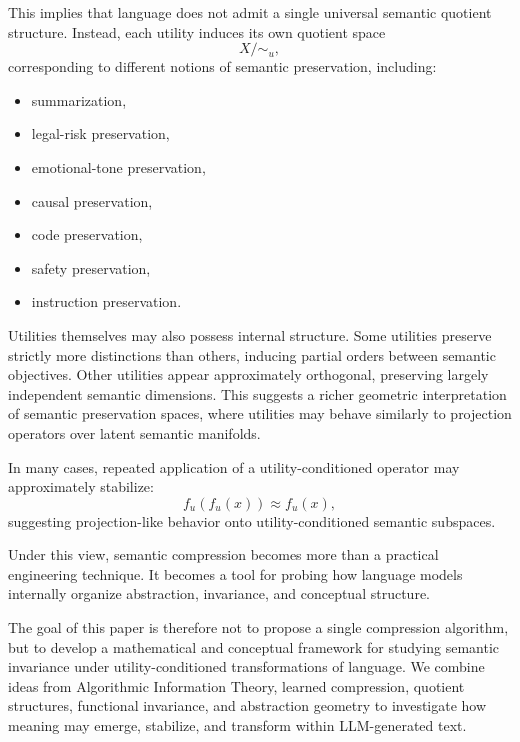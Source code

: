 This implies that language does not admit a single universal semantic quotient structure. Instead, each utility induces its own quotient space
\[
X / {\sim_u},
\]
corresponding to different notions of semantic preservation, including:
\begin{itemize}
    \item summarization,
    \item legal-risk preservation,
    \item emotional-tone preservation,
    \item causal preservation,
    \item code preservation,
    \item safety preservation,
    \item instruction preservation.
\end{itemize}

Utilities themselves may also possess internal structure. Some utilities preserve strictly more distinctions than others, inducing partial orders between semantic objectives. Other utilities appear approximately orthogonal, preserving largely independent semantic dimensions. This suggests a richer geometric interpretation of semantic preservation spaces, where utilities may behave similarly to projection operators over latent semantic manifolds.

In many cases, repeated application of a utility-conditioned operator may approximately stabilize:
\[
f_u(f_u(x)) \approx f_u(x),
\]
suggesting projection-like behavior onto utility-conditioned semantic subspaces.

Under this view, semantic compression becomes more than a practical engineering technique. It becomes a tool for probing how language models internally organize abstraction, invariance, and conceptual structure.

The goal of this paper is therefore not to propose a single compression algorithm, but to develop a mathematical and conceptual framework for studying semantic invariance under utility-conditioned transformations of language. We combine ideas from Algorithmic Information Theory, learned compression, quotient structures, functional invariance, and abstraction geometry to investigate how meaning may emerge, stabilize, and transform within LLM-generated text.